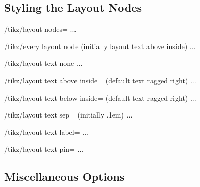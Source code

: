 \subsection{Styling the Layout Nodes}

\begin{key}{/tikz/layout nodes=}
  ...
\end{key}

\begin{stylekey}{/tikz/every layout node (initially layout text above inside)}
  ...
\end{stylekey}


\begin{key}{/tikz/layout text none}
  ...
\end{key}

\begin{key}{/tikz/layout text above inside= (default text ragged right)}
  ...
\end{key}


\begin{key}{/tikz/layout text below inside= (default text ragged right)}
  ...
\end{key}

\begin{key}{/tikz/layout text sep= (initially .1em)}
  ...
\end{key}


\begin{key}{/tikz/layout text label=}
  ...
\end{key}

\begin{key}{/tikz/layout text pin=}
  ...
\end{key}


\subsection{Miscellaneous Options}


\endinput

